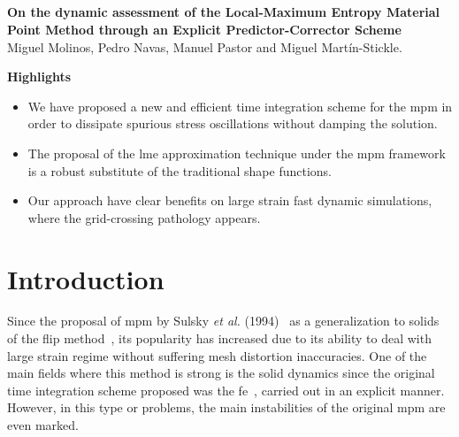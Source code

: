 \documentclass[preprint,12pt,a4paper]{elsarticle}
\begin{document}
\begin{frontmatter}
\section*{}
\centering
\Large
\textbf{On the dynamic assessment of the Local-Maximum Entropy Material Point Method through an Explicit Predictor-Corrector Scheme}\\
\setlength{\parskip}{1cm plus 5mm minus 4mm}
Miguel Molinos, Pedro Navas, Manuel Pastor and Miguel Mart\'in-Stickle.

\setlength{\parskip}{1cm plus 5mm minus 4mm}
\setlength{\parskip}{1cm plus 5mm minus 4mm}
\large
\textbf{Highlights}
\normalsize
\begin{itemize}
\item We have proposed a new and efficient time integration scheme for the \acrshort{mpm} in order to dissipate spurious stress oscillations without damping the solution.
\item The proposal of the \acrshort{lme} approximation technique
  under the \acrshort{mpm} framework is a robust substitute of the
  traditional shape functions.
\item Our approach have clear benefits on large strain fast dynamic simulations, where the grid-crossing pathology appears. 
\end{itemize}


\end{frontmatter}


\linenumbers

\section{Introduction}
\label{intro}
Since the proposal of \acrshort{mpm} by Sulsky {\it  et al.}
(1994)~\cite{Sulsky1994} as a generalization to solids of the \acrfull{flip} method~\cite{Brackbill1986}, its popularity
has increased due to its ability to deal with large strain regime
without suffering mesh distortion inaccuracies. One of the main
  fields where this method is strong is the solid dynamics since the original time integration scheme proposed was the \acrfull{fe}~\cite{Sulsky1994}, carried out in an explicit manner. However, in this type or problems, the main instabilities of the original \acrshort{mpm} are even marked.
\end{document}
